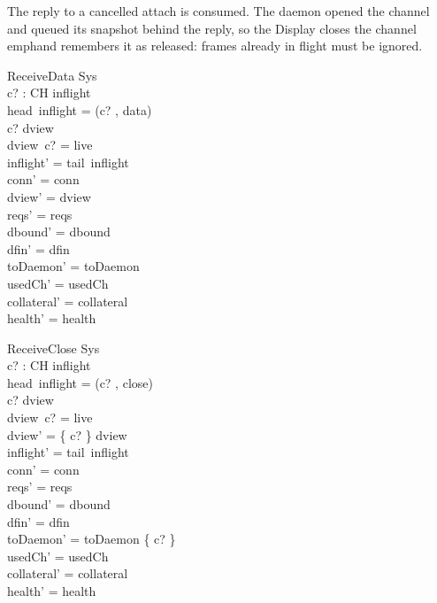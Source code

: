 \documentclass[a4paper,10pt,fleqn]{article}
\begin{document}
The reply to a cancelled attach is consumed.  The daemon opened the channel
and queued its snapshot behind the reply, so the Display closes the channel
\\emph{and remembers it as released}: frames already in flight must be
ignored.

\begin{schema}{ReceiveData}
  \Delta Sys \\
  c? : CH
\where
  inflight \neq \langle \rangle \\
  head~inflight = (c? , data) \\
  c? \in \dom dview \\
  dview~c? = live \\
  inflight' = tail~inflight \\
  conn' = conn \\
  dview' = dview \\
  reqs' = reqs \\
  dbound' = dbound \\
  dfin' = dfin \\
  toDaemon' = toDaemon \\
  usedCh' = usedCh \\
  collateral' = collateral \\
  health' = health
\end{schema}

\begin{schema}{ReceiveClose}
  \Delta Sys \\
  c? : CH
\where
  inflight \neq \langle \rangle \\
  head~inflight = (c? , close) \\
  c? \in \dom dview \\
  dview~c? = live \\
  dview' = \{ c? \} \ndres dview \\
  inflight' = tail~inflight \\
  conn' = conn \\
  reqs' = reqs \\
  dbound' = dbound \\
  dfin' = dfin \\
  toDaemon' = toDaemon \cup \{ c? \} \\
  usedCh' = usedCh \\
  collateral' = collateral \\
  health' = health
\end{schema}
\end{document}
